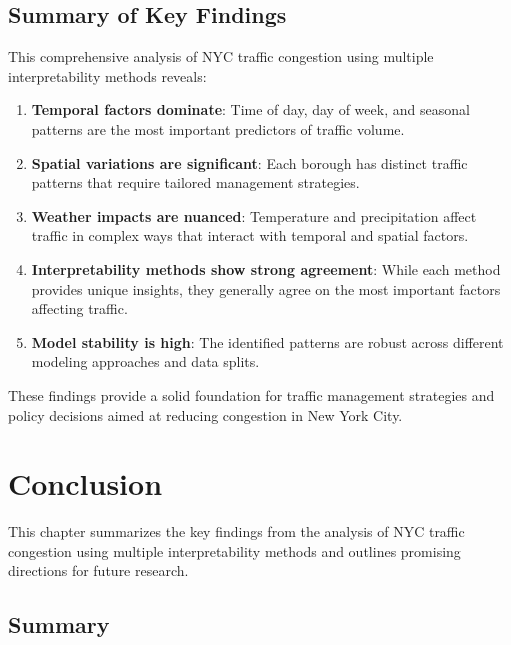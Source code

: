 \documentclass[
  letterpaper,
  DIV=11,
  numbers=noendperiod]{scrreprt}
\begin{document}
\section{Summary of Key Findings}\label{summary-of-key-findings}

This comprehensive analysis of NYC traffic congestion using multiple
interpretability methods reveals:

\begin{enumerate}
\def\labelenumi{\arabic{enumi}.}
\item
  \textbf{Temporal factors dominate}: Time of day, day of week, and
  seasonal patterns are the most important predictors of traffic volume.
\item
  \textbf{Spatial variations are significant}: Each borough has distinct
  traffic patterns that require tailored management strategies.
\item
  \textbf{Weather impacts are nuanced}: Temperature and precipitation
  affect traffic in complex ways that interact with temporal and spatial
  factors.
\item
  \textbf{Interpretability methods show strong agreement}: While each
  method provides unique insights, they generally agree on the most
  important factors affecting traffic.
\item
  \textbf{Model stability is high}: The identified patterns are robust
  across different modeling approaches and data splits.
\end{enumerate}

These findings provide a solid foundation for traffic management
strategies and policy decisions aimed at reducing congestion in New York
City.


\chapter{Conclusion}\label{conclusion}

This chapter summarizes the key findings from the analysis of NYC
traffic congestion using multiple interpretability methods and outlines
promising directions for future research.

\section{Summary}\label{summary-2}
\end{document}
